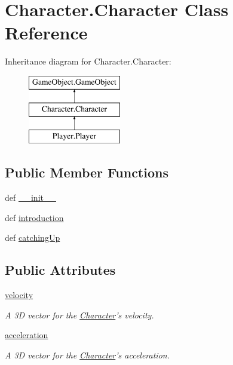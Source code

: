 \hypertarget{classCharacter_1_1Character}{\section{\-Character.\-Character \-Class \-Reference}
\label{classCharacter_1_1Character}
}
\-Inheritance diagram for \-Character.\-Character\-:\begin{figure}[H]
\begin{center}
\leavevmode
\includegraphics[height=3.000000cm]{classCharacter_1_1Character}
\end{center}
\end{figure}
\subsection*{\-Public \-Member \-Functions}
\begin{DoxyCompactItemize}
\item 
def \hyperlink{classCharacter_1_1Character_aaeea994d98f7e7d51dccdfdcb06dbd73}{\-\_\-\-\_\-init\-\_\-\-\_\-}
\item 
def \hyperlink{classCharacter_1_1Character_a30b2039d08a858e628f1801260fa5542}{introduction}
\item 
def \hyperlink{classCharacter_1_1Character_a0c749b4e77403ff141f30bc9dc22521b}{catching\-Up}
\end{DoxyCompactItemize}
\subsection*{\-Public \-Attributes}
\begin{DoxyCompactItemize}
\item 
\hypertarget{classCharacter_1_1Character_ac7d72676b39b540d595e2dd1e24a81a3}{\hyperlink{classCharacter_1_1Character_ac7d72676b39b540d595e2dd1e24a81a3}{velocity}}\label{classCharacter_1_1Character_ac7d72676b39b540d595e2dd1e24a81a3}

\begin{DoxyCompactList}\small\item\em \-A 3\-D vector for the \hyperlink{classCharacter_1_1Character}{\-Character}'s velocity. \end{DoxyCompactList}\item 
\hypertarget{classCharacter_1_1Character_afe735ef35ec0f469fea8276d83780bf6}{\hyperlink{classCharacter_1_1Character_afe735ef35ec0f469fea8276d83780bf6}{acceleration}}\label{classCharacter_1_1Character_afe735ef35ec0f469fea8276d83780bf6}

\begin{DoxyCompactList}\small\item\em \-A 3\-D vector for the \hyperlink{classCharacter_1_1Character}{\-Character}'s acceleration. \end{DoxyCompactList}\end{DoxyCompactItemize}


